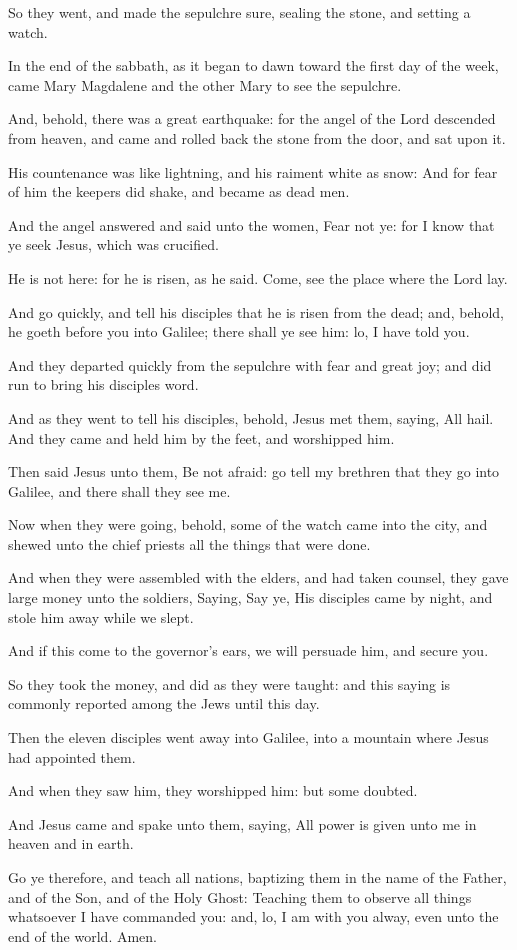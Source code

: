 \Verse So they went, and made the sepulchre sure, sealing the stone, and setting a watch.


\Chapter
\Verse In the end of the sabbath, as it began to dawn toward the first day of the week, came Mary Magdalene and the other Mary to see the sepulchre.

\Verse And, behold, there was a great earthquake: for the angel of the Lord descended from heaven, and came and rolled back the stone from the door, and sat upon it.

\Verse His countenance was like lightning, and his raiment white as snow: \Verse And for fear of him the keepers did shake, and became as dead men.

\Verse And the angel answered and said unto the women, Fear not ye: for I know that ye seek Jesus, which was crucified.

\Verse He is not here: for he is risen, as he said. Come, see the place where the Lord lay.

\Verse And go quickly, and tell his disciples that he is risen from the dead; and, behold, he goeth before you into Galilee; there shall ye see him: lo, I have told you.

\Verse And they departed quickly from the sepulchre with fear and great joy; and did run to bring his disciples word.

\Verse And as they went to tell his disciples, behold, Jesus met them, saying, All hail. And they came and held him by the feet, and worshipped him.

\Verse Then said Jesus unto them, Be not afraid: go tell my brethren that they go into Galilee, and there shall they see me.

\Verse Now when they were going, behold, some of the watch came into the city, and shewed unto the chief priests all the things that were done.

\Verse And when they were assembled with the elders, and had taken counsel, they gave large money unto the soldiers, \Verse Saying, Say ye, His disciples came by night, and stole him away while we slept.

\Verse And if this come to the governor's ears, we will persuade him, and secure you.

\Verse So they took the money, and did as they were taught: and this saying is commonly reported among the Jews until this day.

\Verse Then the eleven disciples went away into Galilee, into a mountain where Jesus had appointed them.

\Verse And when they saw him, they worshipped him: but some doubted.

\Verse And Jesus came and spake unto them, saying, All power is given unto me in heaven and in earth.

\Verse Go ye therefore, and teach all nations, baptizing them in the name of the Father, and of the Son, and of the Holy Ghost: \Verse Teaching them to observe all things whatsoever I have commanded you: and, lo, I am with you alway, even unto the end of the world. Amen.

